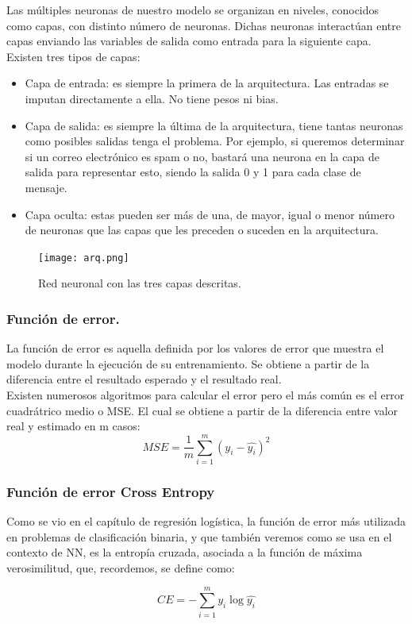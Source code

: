 \documentclass[a4paper,11pt]{article}
\begin{document}
\noindent
Las múltiples neuronas de nuestro modelo se organizan en niveles, conocidos como capas, con distinto número de neuronas. Dichas neuronas interactúan entre capas enviando las variables de salida como entrada para la siguiente capa.
Existen tres tipos de capas:
\begin{itemize}
    \item Capa de entrada: es siempre la primera de la arquitectura. Las entradas se imputan directamente a ella. No tiene pesos ni bias.
    \item Capa de salida: es siempre la última de la arquitectura, tiene tantas neuronas como posibles salidas tenga el problema. Por ejemplo, si queremos determinar si un correo electrónico es spam o no, bastará una neurona en la capa de salida para representar esto, siendo la salida 0 y 1 para cada clase de mensaje. 
    \item Capa oculta: estas pueden ser más de una, de mayor, igual o menor número de neuronas que las capas que les preceden o suceden en la arquitectura.
\end{itemize} 
\begin{figure}[H]
\centering
\texttt{[image: arq.png]}
\caption{Red neuronal con las tres capas descritas.}
\end{figure}
\subsubsection{Función de error.}
La función de error es aquella definida por los valores de error que muestra el modelo durante la ejecución de su entrenamiento. Se obtiene a partir de la diferencia entre el resultado esperado y el resultado real.\\

\noindent
Existen numerosos algoritmos para calcular el error pero el más común es el error cuadrátrico medio o MSE. El cual se obtiene a partir de la diferencia entre valor real y estimado en m casos:
\[
MSE=\frac{1}{m}\sum_{i=1}^m (y_i - \hat{y_i})^2
\]
\subsubsection{Función de error Cross Entropy}
Como se vio en el capítulo de regresión logística, la función de error más
utilizada en problemas de clasificación binaria, y que también veremos como se
usa en el contexto de NN, es la entropía cruzada, asociada a la función de máxima
verosimilitud, que, recordemos, se define como:

\[
CE=-\sum_{i=1}^m y_i \log\hat{y_i}
\]
\end{document}

